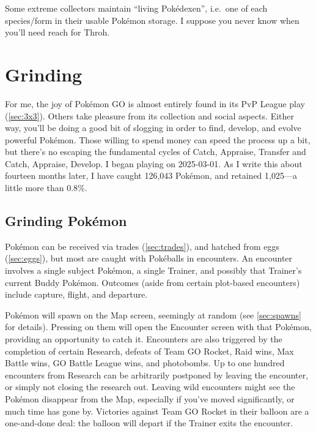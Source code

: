 \begin{tipbox}[title=Living Pokédexen]
Some extreme collectors maintain ``living Pokédexen'', i.e.\ one of each
  species/form in their usable Pokémon storage.
I suppose you never know when you'll need reach for Throh.
\end{tipbox}

\section{Grinding\label{sec:grinding}}
For me, the joy of Pokémon GO is almost entirely found in its PvP League play (\autoref{sec:3x3}).
Others take pleasure from its collection and social aspects.
Either way, you'll be doing a good bit of slogging in order to find, develop,
  and evolve powerful Pokémon.
Those willing to spend money can speed the process up a bit, but there's
  no escaping the fundamental cycles of Catch, Appraise, Transfer and
  Catch, Appraise, Develop. 
I began playing on 2025-03-01.
As I write this about fourteen months later, I have caught 126,043 Pokémon, and retained 1,025---a little more than 0.8\%.

\subsection{Grinding Pokémon\label{subsec:getmons}}
Pokémon can be received via trades (\autoref{sec:trades}),
  and hatched from eggs (\autoref{sec:eggs}),
  but most are caught with Pokéballs in encounters.
An encounter involves a single subject Pokémon, a single Trainer,
  and possibly that Trainer's current Buddy Pokémon.
Outcomes (aside from certain plot-based encounters) include capture, flight, and departure.

Pokémon will spawn on the Map screen, seemingly at random (see \autoref{sec:spawns} for details).
Pressing on them will open the Encounter screen with that Pokémon,
  providing an opportunity to catch it.
Encounters are also triggered by the completion of certain Research,
  defeats of Team GO Rocket, Raid wins, Max Battle wins, GO Battle League wins,
  and photobombs.
Up to one hundred encounters from Research can be arbitrarily postponed by leaving the encounter,
  or simply not closing the research out.
Leaving wild encounters might see the Pokémon disappear from the Map, especially
  if you've moved significantly, or much time has gone by.
Victories against Team GO Rocket in their balloon are a one-and-done deal:
  the balloon will depart if the Trainer exits the encounter.

